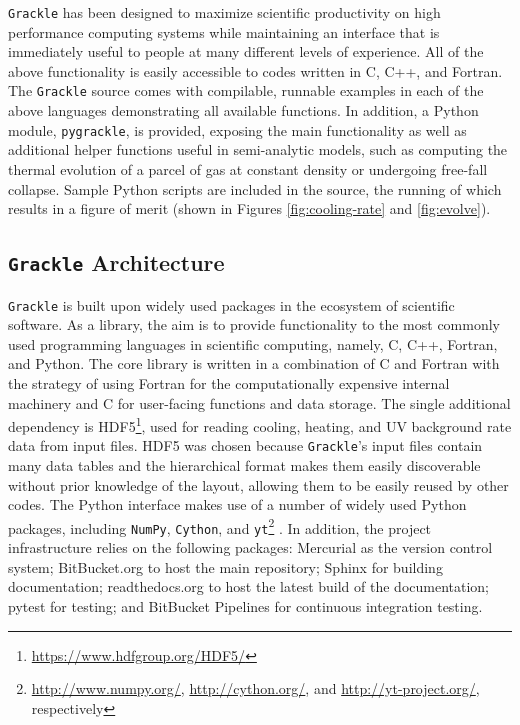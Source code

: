 \documentclass[11pt]{article}
\newcommand{\grackle}{\texttt{Grackle}}
\newcommand{\yt}{\texttt{yt}}
\begin{document}
\begin{flushleft}
\grackle{} has been designed to maximize scientific productivity on
high performance computing systems while maintaining an interface that
is immediately useful to people at many different levels of
experience.
All of the above functionality is easily accessible to codes written
in C, C++, and Fortran.  The \grackle{} source comes with compilable,
runnable examples in each of the above languages demonstrating all
available functions.  In addition, a Python module, \texttt{pygrackle},
is provided, exposing the main functionality as well as additional helper
functions useful in semi-analytic models, such as computing the
thermal evolution of a parcel of gas at constant density or undergoing
free-fall collapse.  Sample Python scripts are included in the source,
the running of which results in a figure of merit (shown in Figures
\ref{fig:cooling-rate} and \ref{fig:evolve}).

\subsection{\grackle{} Architecture}

\grackle{} is built upon widely used packages in the ecosystem of
scientific software.  As a library, the aim is to provide
functionality to the most commonly used programming languages in
scientific computing, namely, C, C++, Fortran, and Python.  The core
library is written in a combination of C and Fortran with the strategy
of using Fortran for the computationally expensive internal machinery
and C for user-facing functions and data storage.  The single
additional dependency is
HDF5\footnote{\url{https://www.hdfgroup.org/HDF5/}}, used for reading
cooling, heating,
and UV background rate data from input files.  HDF5 was chosen because
\grackle{}'s input files contain many data tables and the hierarchical
format makes them easily discoverable without prior knowledge of the
layout, allowing them to be easily reused by other codes.  The Python
interface makes use of a number of widely used Python packages, including
\texttt{NumPy}, \texttt{Cython}, and
\yt{}\footnote{\url{http://www.numpy.org/}, \url{http://cython.org/},
  and \url{http://yt-project.org/}, respectively} \citep[][an SI2-funded
project]{2011ApJS..192....9T}.  In
addition, the project infrastructure relies on the following packages:
Mercurial as the version control system; BitBucket.org to host the
main repository; Sphinx for building documentation; readthedocs.org to
host the latest build of the documentation; pytest for testing; and BitBucket
Pipelines for continuous integration testing.


\end{flushleft}
\end{document}
